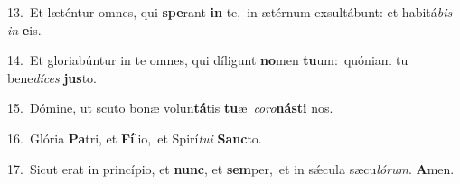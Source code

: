 {\numbfont\textcolor{\numbcolor}{13.}}~Et læténtur omnes, qui \textbf{spe}\-rant \textbf{in} te,~\star in ætérnum exsultábunt: et habitá\textit{bis} \textit{in} \textbf{e}\-is.\par
{\numbfont\textcolor{\numbcolor}{14.}}~Et gloriabúntur in te omnes, qui díligunt \textbf{no}\-men \textbf{tu}\-um:~\star quóniam tu bene\-\textit{dí}\-\textit{ces} \textbf{jus}\-to.\par
{\numbfont\textcolor{\numbcolor}{15.}}~Dómine, ut scuto bonæ volun\-\textbf{tá}\-tis \textbf{tu}\-æ~\star \textit{co}\-\textit{ro}\textbf{nás}\textbf{ti} nos.\par
{\numbfont\textcolor{\numbcolor}{16.}}~Glória \textbf{Pa}\-tri, et \textbf{Fí}\-lio,~\star et Spirí\-\textit{tu}\-\textit{i} \textbf{Sanc}\-to.\par
{\numbfont\textcolor{\numbcolor}{17.}}~Sicut erat in princípio, et \textbf{nunc}\-, et \textbf{sem}\-per,~\star et in sǽcula sæcu\-\textit{ló}\-\textit{rum}. \textbf{A}\-men.\par
